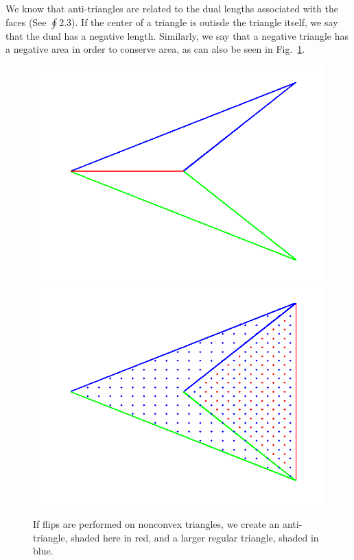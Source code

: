\documentclass[12pt]{article}
\begin{document}
\noindent We know that anti-triangles are related to the dual lengths associated with the faces (See $\oint$2.3). If the center of a triangle is outisde the triangle itself, we say that the dual has a negative length. Similarly, we say that a negative triangle has a negative area in order to conserve area, as can also be seen in Fig.~\ref{AntiTri}. \newline

\begin{figure}
\centering
\includegraphics[scale = 0.4]{Pictures/antitri1.png}
\includegraphics[scale = 0.4]{Pictures/antitri2.png}
\caption{If flips are performed on nonconvex triangles, we create an anti-triangle, shaded here in red, and a larger regular triangle, shaded in blue.}
\label{AntiTri}
\end{figure}
\end{document}
